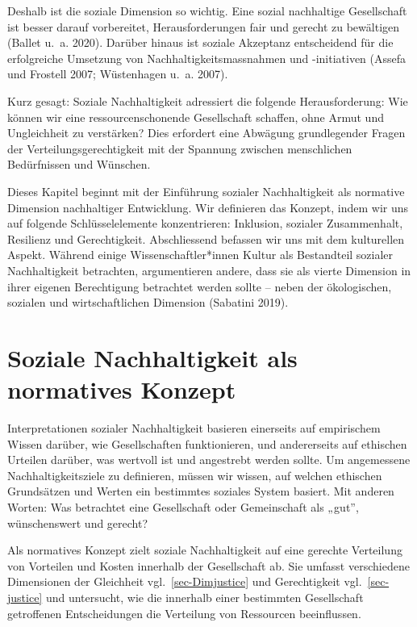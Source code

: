 \documentclass[
  nswissgerman,
  a4paper,
  openany]{book}
\begin{document}
Deshalb ist die soziale Dimension so wichtig. Eine sozial nachhaltige
Gesellschaft ist besser darauf vorbereitet, Herausforderungen fair und
gerecht zu bewältigen (Ballet u.~a. 2020). Darüber hinaus ist soziale
Akzeptanz entscheidend für die erfolgreiche Umsetzung von
Nachhaltigkeitsmassnahmen und -initiativen (Assefa und Frostell 2007;
Wüstenhagen u.~a. 2007).

Kurz gesagt: Soziale Nachhaltigkeit adressiert die folgende
Herausforderung: Wie können wir eine ressourcenschonende Gesellschaft
schaffen, ohne Armut und Ungleichheit zu verstärken? Dies erfordert eine
Abwägung grundlegender Fragen der Verteilungsgerechtigkeit mit der
Spannung zwischen menschlichen Bedürfnissen und Wünschen.

Dieses Kapitel beginnt mit der Einführung sozialer Nachhaltigkeit als
normative Dimension nachhaltiger Entwicklung. Wir definieren das
Konzept, indem wir uns auf folgende Schlüsselelemente konzentrieren:
Inklusion, sozialer Zusammenhalt, Resilienz und Gerechtigkeit.
Abschliessend befassen wir uns mit dem kulturellen Aspekt. Während
einige Wissenschaftler*innen Kultur als Bestandteil sozialer
Nachhaltigkeit betrachten, argumentieren andere, dass sie als vierte
Dimension in ihrer eigenen Berechtigung betrachtet werden sollte --
neben der ökologischen, sozialen und wirtschaftlichen Dimension
(Sabatini 2019).

\section{Soziale Nachhaltigkeit als normatives
Konzept}\label{soziale-nachhaltigkeit-als-normatives-konzept}

Interpretationen sozialer Nachhaltigkeit basieren einerseits auf
empirischem Wissen darüber, wie Gesellschaften funktionieren, und
andererseits auf ethischen Urteilen darüber, was wertvoll ist und
angestrebt werden sollte. Um angemessene Nachhaltigkeitsziele zu
definieren, müssen wir wissen, auf welchen ethischen Grundsätzen und
Werten ein bestimmtes soziales System basiert. Mit anderen Worten: Was
betrachtet eine Gesellschaft oder Gemeinschaft als „gut'', wünschenswert
und gerecht?

Als normatives Konzept zielt soziale Nachhaltigkeit auf eine gerechte
Verteilung von Vorteilen und Kosten innerhalb der Gesellschaft ab. Sie
umfasst verschiedene Dimensionen der Gleichheit
vgl.~\ref{sec-Dimjustice} und Gerechtigkeit vgl.~\ref{sec-justice} und
untersucht, wie die innerhalb einer bestimmten Gesellschaft getroffenen
Entscheidungen die Verteilung von Ressourcen beeinflussen.
\end{document}
